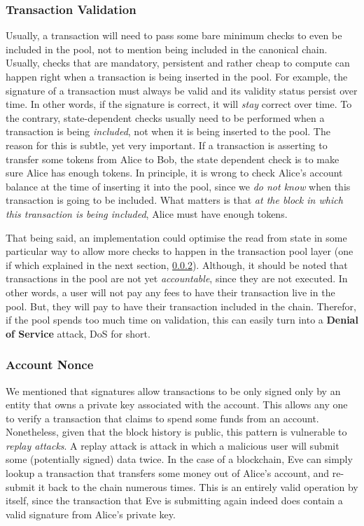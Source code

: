 \subsubsection{Transaction Validation} \label{chap_bg:subsec:validation}

Usually, a transaction will need to pass some bare minimum checks to even be included in the pool,
not to mention being included in the canonical chain. Usually, checks that are mandatory, persistent
and rather cheap to compute can happen right when a transaction is being inserted in the pool. For
example, the signature of a transaction must always be valid and its validity status persist over
time. In other words, if the signature is correct, it will \textit{stay} correct over time. To the
contrary, state-dependent checks usually need to be performed when a transaction is being
\textit{included}, not when it is being inserted to the pool. The reason for this is subtle, yet
very important. If a transaction is asserting to transfer some tokens from Alice to Bob, the state
dependent check is to make sure Alice has enough tokens. In principle, it is wrong to check Alice's
account balance at the time of inserting it into the pool, since we \textit{do not know} when this
transaction is going to be included. What matters is that \textit{at the block in which this transaction is
being included}, Alice must have enough tokens.

That being said, an implementation could optimise the read from state in some particular way to
allow more checks to happen in the transaction pool layer (one if which explained in the next
section, \ref{chap_bg:subsec:nonce}). Although, it should be noted that transactions in the pool are
not yet \textit{accountable}, since they are not executed. In other words, a user will not pay any
fees to have their transaction live in the pool. But, they will pay to have their transaction
included in the chain. Therefor, if the pool spends too much time on validation, this can easily
turn into a \textbf{Denial of Service} attack, DoS for short.

\subsubsection{Account Nonce} \label{chap_bg:subsec:nonce}

We mentioned that signatures allow transactions to be only signed only by an entity that owns a
private key associated with the account. This allows any one to verify a transaction that claims to
spend some funds from an account. Nonetheless, given that the block history is public, this pattern
is vulnerable to \textit{replay attacks}. A replay attack is attack in which a malicious user will
submit some (potentially signed) data twice. In the case of a blockchain, Eve can simply lookup a
transaction that transfers some money out of Alice's account, and re-submit it back to the chain
numerous times. This is an entirely valid operation by itself, since the transaction that Eve is
submitting again indeed does contain a valid signature from Alice's private key.

